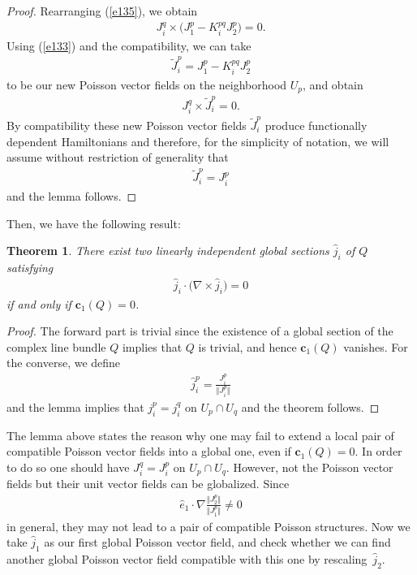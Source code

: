 \documentclass[10pt,a4paper]{amsart}
\numberwithin{equation}{section}
\newtheorem{Theorem}{Theorem}[section]
\begin{document}
\begin{proof}
Rearranging (\ref{e135}), we obtain
\begin{gather*}
J_{i}^{q}\times \big( J_{1}^{p}-K_{i}^{pq}J_{2}^{p}\big) =0.
\end{gather*}
Using (\ref{e133}) and the compatibility, we can take
\begin{gather*}
\widetilde{J}_{i}^{p}=J_{1}^{p}-K_{i}^{pq}J_{2}^{p}
\end{gather*}
to be our new Poisson vector f\/ields on the neighborhood $U_{p}$, and obtain
\begin{gather*}
J_{i}^{q}\times \widetilde{J}_{i}^{p}=0.
\end{gather*}
By compatibility these new Poisson vector f\/ields $\widetilde{J}_{i}^{p}$ produce functionally dependent Hamilto\-nians and therefore, for the simplicity of notation, we will assume without restriction of generality that
\begin{gather*}
\widetilde{J}_{i}^{p}=J_{i}^{p}
\end{gather*}
and the lemma follows.
\end{proof}

Then, we have the following result:

\begin{Theorem}\label{theorem3}
There exist two linearly independent global sections $\widehat{j}_{i}$ of $Q$ satisfying
\begin{gather}
\widehat{j}_{i}\cdot \big( \nabla \times \widehat{j}_{i}\big) =0\label{e140}
\end{gather}
if and only if $\boldsymbol{c}_{1}(Q) =0$.
\end{Theorem}

\begin{proof}
The forward part is trivial since the existence of a global section of the complex line bundle $Q$ implies that $Q$ is trivial, and hence $\boldsymbol{c}_{1}(Q) $ vanishes. For the converse, we def\/ine
\begin{gather*}
\widehat{j}_{i}^{p}=\frac{J_{i}^{p}}{\big\Vert J_{i}^{p}\big\Vert }
\end{gather*}
and the lemma implies that $j_{i}^{p}=j_{i}^{q}$ on $U_{p}\cap U_{q}$ and the theorem follows.
\end{proof}

The lemma above states the reason why one may fail to extend a local pair of compatible Poisson vector f\/ields into a global one, even if $\boldsymbol{c}_{1}(Q) =0$. In order to do so one should have $J_{i}^{q}=J_{i}^{p}$ on $U_{p}\cap U_{q}$. However, not the Poisson vector f\/ields but their unit vector f\/ields can be globalized. Since
\begin{gather*}
\widehat{e}_{1}\cdot \nabla \frac{\big\Vert J_{2}^{p}\big\Vert }{\big\Vert J_{1}^{p}\big\Vert }\neq 0 %
\end{gather*}
in general, they may not lead to a pair of compatible Poisson structures. Now we take $\widehat{j}_{1}$ as our f\/irst global Poisson vector f\/ield, and check whether we can f\/ind another global Poisson vector f\/ield compatible with this one by rescaling~$\widehat{j}_{2}$.
\end{document}

